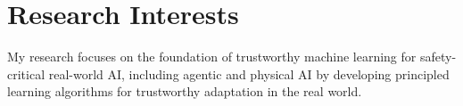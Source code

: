 
\section{Research Interests}

My research focuses on the foundation of trustworthy machine learning for safety-critical real-world AI, including agentic and physical AI by developing principled learning algorithms for trustworthy adaptation in the real world.




